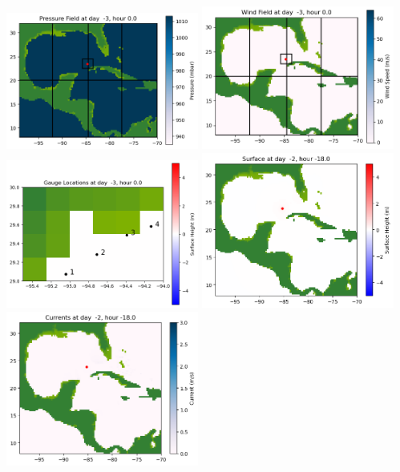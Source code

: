 \documentclass[11pt]{article}
\begin{document}
\includegraphics[width=0.475\textwidth]{frame0000fig1006.png}
\vskip 10pt 
\includegraphics[width=0.475\textwidth]{frame0000fig1007.png}
\includegraphics[width=0.475\textwidth]{frame0000fig1008.png}
\vskip 10pt 
\includegraphics[width=0.475\textwidth]{frame0001fig1001.png}
\includegraphics[width=0.475\textwidth]{frame0001fig1002.png}
\end{document}

